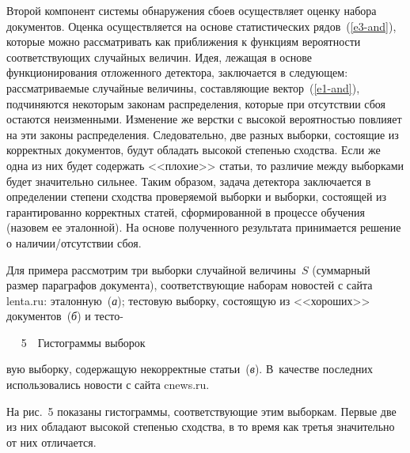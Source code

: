 \begin{multicols}{2}
    Второй компонент системы обнаружения сбоев осуществляет оценку набора 
документов. Оценка осуществляется на основе статистических 
  рядов~(\ref{e3-and}), которые можно рассматривать как приближения к 
функциям вероятности соответствующих случайных величин. Идея, лежащая в 
основе функционирования отложенного детектора, заключается в следующем: 
рассматриваемые случайные величины, составляющие вектор~(\ref{e1-and}), 
подчиняются некоторым законам распределения, которые при отсутствии сбоя 
остаются неизменными. Изменение же верстки с высокой вероятностью 
повлияет на эти законы распределения. Следовательно, две разных выборки, 
состоящие из корректных документов, будут обладать высокой степенью 
сходства. Если же одна из них будет содержать <<плохие>> статьи, то различие 
между выборками будет значительно сильнее. Таким образом, задача детектора 
заключается в определении степени сходства проверяемой выборки и выборки, 
состоящей из гарантированно корректных статей, сформированной в процессе 
обучения (назовем ее эталонной). На основе полученного результата 
принимается решение о наличии/отсутствии сбоя. 
  
    Для примера рассмотрим три выборки случайной величины~$S$ 
(суммарный размер параграфов документа), соответствующие наборам 
новостей с сайта {\sf lenta.ru}: эталонную~(\textit{а}); тестовую выборку, состоящую из 
<<хороших>> документов~(\textit{б}) и тесто-\linebreak\vspace*{-12pt}
\begin{center}  %
\vspace*{1pt}
 \mbox{%
 \epsfxsize=71.266mm
 }
 \vspace*{4pt}
{{\figurename~5}\ \ \small{Гистограммы выборок}}
 \end{center}



\vspace*{6pt}

\addtocounter{figure}{1}

\noindent
вую выборку, содержащую некорректные 
статьи~(\textit{в}). В~качестве последних использовались новости с сайта {\sf cnews.ru}. 
  
  На рис.~5 показаны гистограммы, соответствующие этим выборкам. Первые 
две из них обладают высокой степенью сходства, в то время как третья 
значительно от них отличается.


\end{multicols}
